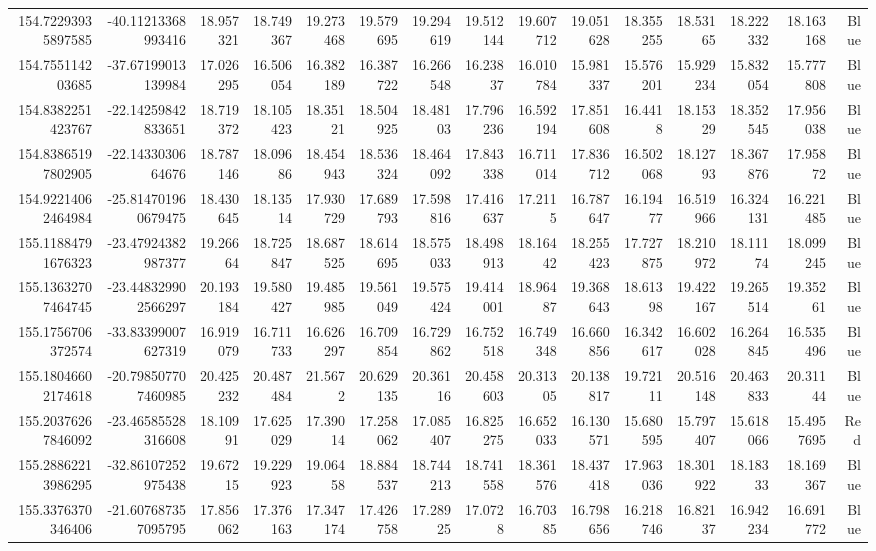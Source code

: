 \begin{center}
\begin{longtable}{rrrrrrrrrrrrrrr}
154.72293935897585 & -40.11213368993416 & 18.957321 & 18.749367 & 19.273468 & 19.579695 & 19.294619 & 19.512144 & 19.607712 & 19.051628 & 18.355255 & 18.53165 & 18.222332 & 18.163168 & Blue \\
154.755114203685 & -37.67199013139984 & 17.026295 & 16.506054 & 16.382189 & 16.387722 & 16.266548 & 16.23837 & 16.010784 & 15.981337 & 15.576201 & 15.929234 & 15.832054 & 15.777808 & Blue \\
154.8382251423767 & -22.14259842833651 & 18.719372 & 18.105423 & 18.35121 & 18.504925 & 18.48103 & 17.796236 & 16.592194 & 17.851608 & 16.4418 & 18.15329 & 18.352545 & 17.956038 & Blue \\
154.83865197802905 & -22.1433030664676 & 18.787146 & 18.09686 & 18.454943 & 18.536324 & 18.464092 & 17.843338 & 16.711014 & 17.836712 & 16.502068 & 18.12793 & 18.367876 & 17.95872 & Blue \\
154.92214062464984 & -25.814701960679475 & 18.430645 & 18.13514 & 17.930729 & 17.689793 & 17.598816 & 17.416637 & 17.2115 & 16.787647 & 16.19477 & 16.519966 & 16.324131 & 16.221485 & Blue \\
155.11884791676323 & -23.47924382987377 & 19.26664 & 18.725847 & 18.687525 & 18.614695 & 18.575033 & 18.498913 & 18.16442 & 18.255423 & 17.727875 & 18.210972 & 18.11174 & 18.099245 & Blue \\
155.13632707464745 & -23.448329902566297 & 20.193184 & 19.580427 & 19.485985 & 19.561049 & 19.575424 & 19.414001 & 18.96487 & 19.368643 & 18.61398 & 19.422167 & 19.265514 & 19.35261 & Blue \\
155.1756706372574 & -33.83399007627319 & 16.919079 & 16.711733 & 16.626297 & 16.709854 & 16.729862 & 16.752518 & 16.749348 & 16.660856 & 16.342617 & 16.602028 & 16.264845 & 16.535496 & Blue \\
155.18046602174618 & -20.798507707460985 & 20.425232 & 20.487484 & 21.5672 & 20.629135 & 20.36116 & 20.458603 & 20.31305 & 20.138817 & 19.72111 & 20.516148 & 20.463833 & 20.31144 & Blue \\
155.20376267846092 & -23.46585528316608 & 18.10991 & 17.625029 & 17.39014 & 17.258062 & 17.085407 & 16.825275 & 16.652033 & 16.130571 & 15.680595 & 15.797407 & 15.618066 & 15.4957695 & Red \\
155.28862213986295 & -32.86107252975438 & 19.67215 & 19.229923 & 19.06458 & 18.884537 & 18.744213 & 18.741558 & 18.361576 & 18.437418 & 17.963036 & 18.301922 & 18.18333 & 18.169367 & Blue \\
155.3376370346406 & -21.607687357095795 & 17.856062 & 17.376163 & 17.347174 & 17.426758 & 17.28925 & 17.0728 & 16.70385 & 16.798656 & 16.218746 & 16.82137 & 16.942234 & 16.691772 & Blue \\

\end{longtable}
\end{center}
